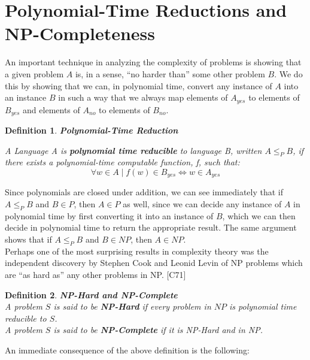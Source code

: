 \documentclass{article}
\newtheorem{definition}{Definition}[section]
\renewcommand{\cite}[1]{[#1]}
\renewcommand{\cite}[1]{[#1]}
\begin{document}
\section{Polynomial-Time Reductions and NP-Completeness}

An important technique in analyzing the complexity of problems is
showing that a given problem $A$ is, in a sense, ``no harder
than'' some other problem $B$.  We do this by showing that we can,
in polynomial time, convert any instance of $A$ into an instance
$B$ in such a way that we always map elements of $A_{yes}$ to
elements of $B_{yes}$ and elements of $A_{no}$ to elements of
$B_{no}$.  

\begin{definition}{\textbf{Polynomial-Time Reduction}}
  
  A Language A is \textbf{polynomial time reducible} to language
  B, written $A \leq_P B$, if there exists a polynomial-time
  computable function, f, such that: 
  $$\forall w \in A \mid f(w) \in B_{yes} \Leftrightarrow w \in A_{yes}$$
  
\end{definition}

Since polynomials are closed under addition, we can see
immediately that if $A \leq_P B$ and $B \in P$, then $A \in P$ as
well, since we can decide any instance of $A$ in polynomial time
by first converting it into an instance of $B$, which we can then
decide in polynomial time to return the appropriate result.  The
same argument shows that if $A \leq_P B$ and $B \in NP$, then $A \in
NP$.\\

Perhaps one of the most surprising results in complexity theory was
the independent discovery by Stephen Cook and Leonid Levin of NP
problems which are ``as hard as'' any other problems in NP. \cite{C71}

\begin{definition}{\textbf{NP-Hard and NP-Complete}}\\

  A problem $S$ is said to be \textbf{NP-Hard} if every problem in
  $NP$ is polynomial time reducible to $S$.\\
  
  A problem $S$ is said to be \textbf{NP-Complete} if it is
  NP-Hard and in NP.\\
\end{definition}

An immediate consequence of the above definition is the following:
\end{document}
